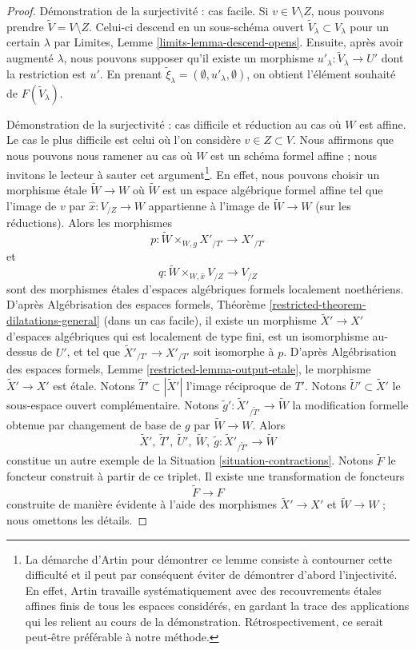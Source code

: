 \begin{proof}
\medskip\noindent
Démonstration de la surjectivité : cas facile.
Si $v \in V \setminus Z$, nous pouvons prendre $\tilde V = V \setminus Z$.
Celui-ci descend en un sous-schéma ouvert $\tilde V_\lambda \subset V_\lambda$
pour un certain $\lambda$ par Limites, Lemme
\ref{limits-lemma-descend-opens}.
Ensuite, après avoir augmenté $\lambda$, nous pouvons supposer
qu'il existe un morphisme $u'_\lambda : \tilde V_\lambda \to U'$
dont la restriction est $u'$. En prenant
$\tilde \xi_\lambda = (\emptyset, u'_\lambda, \emptyset)$,
on obtient l'élément souhaité de $F(\tilde V_\lambda)$.

\medskip\noindent
Démonstration de la surjectivité : cas difficile et réduction au cas où $W$ est affine.
Le cas le plus difficile est celui où l'on considère $v \in Z \subset V$.
Nous affirmons que nous pouvons nous ramener au cas où $W$ est un
schéma formel affine ; nous invitons le lecteur à sauter cet argument\footnote{La démarche
d'Artin pour démontrer ce lemme consiste à contourner cette difficulté et
il peut par conséquent éviter de démontrer d'abord l'injectivité. En effet, Artin
travaille systématiquement avec des recouvrements \'etales affines finis de tous les espaces
considérés, en gardant la trace des applications qui les relient au cours de la démonstration.
Rétrospectivement, ce serait peut-être préférable à notre méthode.}.
En effet, nous pouvons choisir un morphisme \'etale
$\tilde W \to W$ où $\tilde W$ est un espace algébrique formel affine
tel que l'image de $v$ par $\hat x : V_{/Z} \to W$
appartienne à l'image de $\tilde W \to W$ (sur les réductions).
Alors les morphismes
$$
p : \tilde W \times_{W, g} X'_{/T'} \longrightarrow X'_{/T'}
$$
et
$$
q : \tilde W \times_{W, \hat x} V_{/Z} \to V_{/Z}
$$
sont des morphismes \'etales d'espaces algébriques formels localement noethériens.
D'après Algébrisation des espaces formels, Théorème
\ref{restricted-theorem-dilatations-general} (dans un cas facile),
il existe un morphisme $\tilde X' \to X'$ d'espaces algébriques
qui est localement de type fini, est un isomorphisme au-dessus de $U'$, et
tel que $\tilde X'_{/T'} \to X'_{/T'}$ soit isomorphe à $p$.
D'après Algébrisation des espaces formels, Lemme \ref{restricted-lemma-output-etale},
le morphisme $\tilde X' \to X'$ est \'etale. Notons
$\tilde T' \subset |\tilde X'|$ l'image réciproque de $T'$.
Notons $\tilde U' \subset \tilde X'$ le sous-espace ouvert complémentaire.
Notons $\tilde g' : \tilde X'_{/\tilde T'} \to \tilde W$
la modification formelle obtenue par changement de base de $g$ par
$\tilde W \to W$. Alors
$$
\tilde X',\ \tilde T',\ \tilde U',\ \tilde W,
\ \tilde g : \tilde X'_{/\tilde T'} \to \tilde W
$$
constitue un autre exemple de la Situation \ref{situation-contractions}.
Notons $\tilde F$ le foncteur construit à partir de ce triplet.
Il existe une transformation de foncteurs
$$
\tilde F \longrightarrow F
$$
construite de manière évidente à l'aide des morphismes $\tilde X' \to X'$ et
$\tilde W \to W$ ; nous omettons les détails.


\end{proof}

